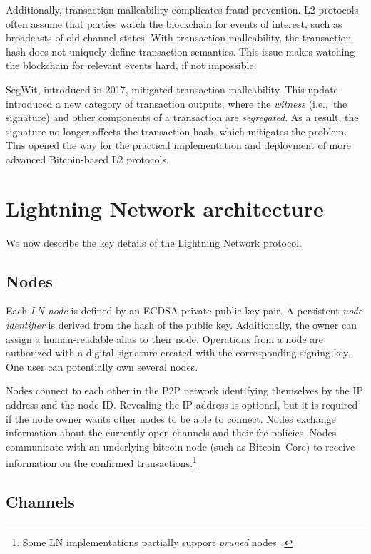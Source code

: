Additionally, transaction malleability complicates fraud prevention.
L2 protocols often assume that parties watch the blockchain for events of interest, such as broadcasts of old channel states.
With transaction malleability, the transaction hash does not uniquely define transaction semantics.
This issue makes watching the blockchain for relevant events hard, if not impossible.

SegWit, introduced in 2017, mitigated transaction malleability.
This update introduced a new category of transaction outputs, where the \textit{witness} (i.e.,~the signature) and other components of a transaction are \textit{segregated}.
As a result, the signature no longer affects the transaction hash, which mitigates the problem.
This opened the way for the practical implementation and deployment of more advanced Bitcoin-based L2 protocols.


\section{Lightning Network architecture}
\label{sec:LightningOverview}

We now describe the key details of the Lightning Network protocol.

\subsection{Nodes}

Each \textit{LN node} is defined by an ECDSA private-public key pair.
A persistent \textit{node identifier} is derived from the hash of the public key. 
Additionally, the owner can assign a human-readable alias to their node.
Operations from a node are authorized with a digital signature created with the corresponding signing key.
One user can potentially own several nodes.

Nodes connect to each other in the P2P network identifying themselves by the IP address and the node ID\@.
Revealing the IP address is optional, but it is required if the node owner wants other nodes to be able to connect.
Nodes exchange information about the currently open channels and their fee policies.
Nodes communicate with an underlying bitcoin node (such as Bitcoin~Core) to receive information on the confirmed transactions.\footnote{Some LN implementations partially support \textit{pruned} nodes~\cite{LNDInstall}.}


\subsection{Channels}

